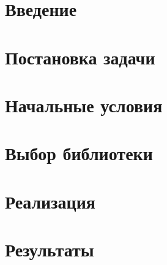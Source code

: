 





\maketitle
\setcounter{tocdepth}{2}
\tableofcontents

\section{Введение}
\label{sec:intro}


\section{Постановка задачи}
\label{sec:task}


\section{Начальные условия}
\label{sec:basic}


\section{Выбор библиотеки}
\label{sec:libs}


\section{Реализация}
\label{sec:approach}



\section{Результаты}
\label{sec:conclusion}


\nocite{*}




